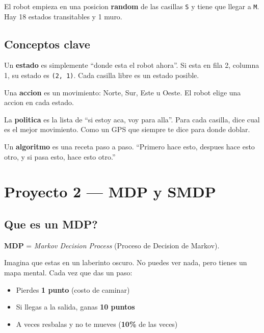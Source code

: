 \documentclass[11pt,a4paper]{article}
\newcommand{\codigo}[1]{\texttt{\small #1}}
\newcommand{\vocab}[1]{\textbf{\textcolor{accentblue}{#1}}}
\begin{document}
El robot empieza en una posicion \textbf{random} de las casillas \codigo{S} y tiene que llegar a \codigo{M}. Hay 18 estados transitables y 1 muro.

\subsection{Conceptos clave}

\begin{definicion}[Estado]
Un \vocab{estado} es simplemente ``donde esta el robot ahora''. Si esta en fila 2, columna 1, su estado es \codigo{(2, 1)}. Cada casilla libre es un estado posible.
\end{definicion}

\begin{definicion}[Accion]
Una \vocab{accion} es un movimiento: Norte, Sur, Este u Oeste. El robot elige una accion en cada estado.
\end{definicion}

\begin{definicion}[Politica]
La \vocab{politica} es la lista de ``si estoy aca, voy para alla''. Para cada casilla, dice cual es el mejor movimiento. Como un GPS que siempre te dice para donde doblar.
\end{definicion}

\begin{definicion}[Algoritmo]
Un \vocab{algoritmo} es una receta paso a paso. ``Primero hace esto, despues hace esto otro, y si pasa esto, hace esto otro.''
\end{definicion}

\newpage

\section{Proyecto 2 — MDP y SMDP}

\subsection{Que es un MDP?}

\textbf{MDP} = \textit{Markov Decision Process} (Proceso de Decision de Markov).

Imagina que estas en un laberinto oscuro. No puedes ver nada, pero tienes un mapa mental. Cada vez que das un paso:

\begin{itemize}
    \item Pierdes \textbf{1 punto} (costo de caminar)
    \item Si llegas a la salida, ganas \textbf{10 puntos}
    \item A veces resbalas y no te mueves (\textbf{10\%} de las veces)
\end{itemize}
\end{document}
